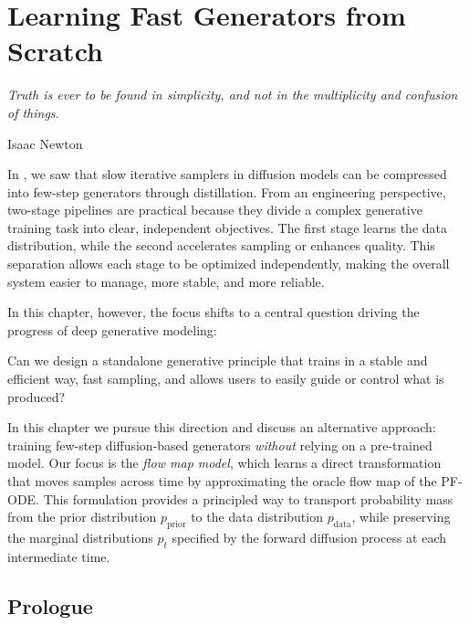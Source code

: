 \chapter{Learning Fast Generators from Scratch}\label{ch:fast-scratch}

\epigraph{
    \textit{Truth is ever to be found in simplicity, and not in the multiplicity and confusion of things.
}}{Isaac Newton}


In , we saw that slow iterative samplers in diffusion models can be compressed into few-step generators through distillation. From an engineering perspective, two-stage pipelines are practical because they divide a complex generative training task into clear, independent objectives. The first stage learns the data distribution, while the second accelerates sampling or enhances quality. This separation allows each stage to be optimized independently, making the overall system easier to manage, more stable, and more reliable.

In this chapter, however, the focus shifts to a central question driving the progress of deep generative modeling:
\begin{question}
    Can we design a standalone generative principle that trains in a stable and efficient way, fast sampling, and allows users to easily guide or control what is produced?
\end{question}
In this chapter we pursue this direction and discuss an alternative approach:
training few-step diffusion-based generators \emph{without} relying on a pre-trained model.
Our focus is the \emph{flow map model}, which learns a direct transformation that moves samples across time by approximating the oracle flow map of the PF-ODE.
This formulation provides a principled way to transport probability mass from the prior distribution $p_{\mathrm{prior}}$ to the data distribution $p_{\mathrm{data}}$,
while preserving the marginal distributions $p_t$ specified by the forward diffusion process at each intermediate time.


\newpage

\section{Prologue}

